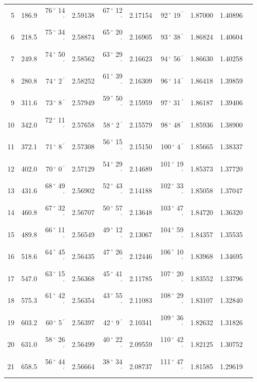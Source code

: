 \documentclass[12pt,a4paper]{article}
\newcommand{\Grad}{\,^\circ}
\newcommand{\Min}{\,^\prime}
\begin{document}
\begin{small}
\begin{longtable}{@{}rr|rr|rr|rr|rr@{}}
5 & 186.9 & 76$\Grad$ 14$\Min$ & 2.59138 & 67$\Grad$ 12$\Min$ & 2.17154 & 92$\Grad$ 19$\Min$ & 1.87000 & 1.40896 \\
6 & 218.5 & 75$\Grad$ 34$\Min$ & 2.58874 & 65$\Grad$ 20$\Min$ & 2.16905 & 93$\Grad$ 38$\Min$ & 1.86824 & 1.40604 \\
7 & 249.8 & 74$\Grad$ 50$\Min$ & 2.58562 & 63$\Grad$ 29$\Min$ & 2.16623 & 94$\Grad$ 56$\Min$ & 1.86630 & 1.40258 \\
8 & 280.8 & 74$\Grad$ 2$\Min$ & 2.58252 & 61$\Grad$ 39$\Min$ & 2.16309 & 96$\Grad$ 14$\Min$ & 1.86418 & 1.39859 \\
9 & 311.6 & 73$\Grad$ 8$\Min$ & 2.57949 & 59$\Grad$ 50$\Min$ & 2.15959 & 97$\Grad$ 31$\Min$ & 1.86187 & 1.39406 \\
10 & 342.0 & 72$\Grad$ 11$\Min$ & 2.57658 & 58$\Grad$ 2$\Min$ & 2.15579 & 98$\Grad$ 48$\Min$ & 1.85936 & 1.38900 \\
11 & 372.1 & 71$\Grad$ 8$\Min$ & 2.57308 & 56$\Grad$ 15$\Min$ & 2.15150 & 100$\Grad$ 4$\Min$ & 1.85665 & 1.38337 \\
12 & 402.0 & 70$\Grad$ 0$\Min$ & 2.57129 & 54$\Grad$ 29$\Min$ & 2.14689 & 101$\Grad$ 19$\Min$ & 1.85373 & 1.37720 \\
13 & 431.6 & 68$\Grad$ 49$\Min$ & 2.56902 & 52$\Grad$ 43$\Min$ & 2.14188 & 102$\Grad$ 33$\Min$ & 1.85058 & 1.37047 \\
14 & 460.8 & 67$\Grad$ 32$\Min$ & 2.56707 & 50$\Grad$ 57$\Min$ & 2.13648 & 103$\Grad$ 47$\Min$ & 1.84720 & 1.36320 \\
15 & 489.8 & 66$\Grad$ 11$\Min$ & 2.56549 & 49$\Grad$ 12$\Min$ & 2.13067 & 104$\Grad$ 59$\Min$ & 1.84357 & 1.35535 \\
16 & 518.6 & 64$\Grad$ 45$\Min$ & 2.56435 & 47$\Grad$ 26$\Min$ & 2.12446 & 106$\Grad$ 10$\Min$ & 1.83968 & 1.34695 \\
17 & 547.0 & 63$\Grad$ 15$\Min$ & 2.56368 & 45$\Grad$ 41$\Min$ & 2.11785 & 107$\Grad$ 20$\Min$ & 1.83552 & 1.33796 \\
18 & 575.3 & 61$\Grad$ 42$\Min$ & 2.56354 & 43$\Grad$ 55$\Min$ & 2.11083 & 108$\Grad$ 29$\Min$ & 1.83107 & 1.32840 \\
19 & 603.2 & 60$\Grad$ 5$\Min$ & 2.56397 & 42$\Grad$ 9$\Min$ & 2.10341 & 109$\Grad$ 36$\Min$ & 1.82632 & 1.31826 \\
20 & 631.0 & 58$\Grad$ 26$\Min$ & 2.56499 & 40$\Grad$ 22$\Min$ & 2.09559 & 110$\Grad$ 42$\Min$ & 1.82125 & 1.30752 \\
21 & 658.5 & 56$\Grad$ 44$\Min$ & 2.56664 & 38$\Grad$ 34$\Min$ & 2.08737 & 111$\Grad$ 47$\Min$ & 1.81585 & 1.29619 \\

\end{longtable}
\end{small}
\end{document}
